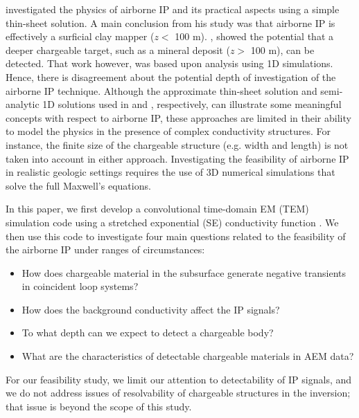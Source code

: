 \documentclass[manuscript]{geophysics}
\begin{document}
\cite{macnae2016} investigated the physics of airborne IP and its practical aspects using a simple thin-sheet solution. A main conclusion from his study was that airborne IP is effectively a surficial clay mapper ($z<$ 100 m). \cite{viezzoli2017}, showed the potential that a deeper chargeable target, such as a mineral deposit ($z>$ 100 m), can be detected. That work however, was based upon analysis using 1D simulations. Hence, there is disagreement about the potential depth of investigation of the airborne IP technique. Although the approximate thin-sheet solution and semi-analytic 1D solutions used in \cite{macnae2016} and \cite{viezzoli2017}, respectively, can illustrate some meaningful concepts with respect to airborne IP, these approaches are limited in their ability to model the physics in the presence of complex conductivity structures. For instance, the finite size of the chargeable structure (e.g. width and length) is not taken into account in either approach. Investigating the feasibility of airborne IP in realistic geologic settings requires the use of 3D numerical simulations that solve the full Maxwell's equations.

In this paper, we first develop a convolutional time-domain EM (TEM) simulation code using a stretched exponential (SE) conductivity function \cite[]{kohlrausch1854}. We then use this code to investigate four main questions related to the feasibility of the airborne IP under ranges of circumstances:
\begin{itemize}
  \item How does chargeable material in the subsurface generate negative transients in coincident loop systems?
  \item How does the background conductivity affect the IP signals?
  \item To what depth can we expect to detect a chargeable body?
  \item What are the characteristics of detectable chargeable materials in AEM data?
\end{itemize}
For our feasibility study, we limit our attention to detectability of IP signals, and we do not address issues of resolvability of chargeable structures in the inversion; that  issue is beyond the scope of this study.
\end{document}
